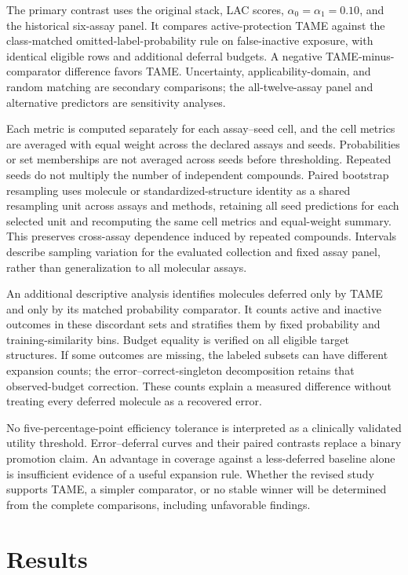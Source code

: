 \documentclass[11pt]{article}
\begin{document}
The primary contrast uses the original stack, LAC scores, $\alpha_0=\alpha_1=0.10$, and the historical six-assay panel. It compares active-protection TAME against the class-matched omitted-label-probability rule on false-inactive exposure, with identical eligible rows and additional deferral budgets. A negative TAME-minus-comparator difference favors TAME. Uncertainty, applicability-domain, and random matching are secondary comparisons; the all-twelve-assay panel and alternative predictors are sensitivity analyses.

Each metric is computed separately for each assay--seed cell, and the cell metrics are averaged with equal weight across the declared assays and seeds. Probabilities or set memberships are not averaged across seeds before thresholding. Repeated seeds do not multiply the number of independent compounds. Paired bootstrap resampling uses molecule or standardized-structure identity as a shared resampling unit across assays and methods, retaining all seed predictions for each selected unit and recomputing the same cell metrics and equal-weight summary. This preserves cross-assay dependence induced by repeated compounds. Intervals describe sampling variation for the evaluated collection and fixed assay panel, rather than generalization to all molecular assays.

An additional descriptive analysis identifies molecules deferred only by TAME and only by its matched probability comparator. It counts active and inactive outcomes in these discordant sets and stratifies them by fixed probability and training-similarity bins. Budget equality is verified on all eligible target structures. If some outcomes are missing, the labeled subsets can have different expansion counts; the error--correct-singleton decomposition retains that observed-budget correction. These counts explain a measured difference without treating every deferred molecule as a recovered error.

No five-percentage-point efficiency tolerance is interpreted as a clinically validated utility threshold. Error--deferral curves and their paired contrasts replace a binary promotion claim. An advantage in coverage against a less-deferred baseline alone is insufficient evidence of a useful expansion rule. Whether the revised study supports TAME, a simpler comparator, or no stable winner will be determined from the complete comparisons, including unfavorable findings.

\section{Results}
\end{document}
